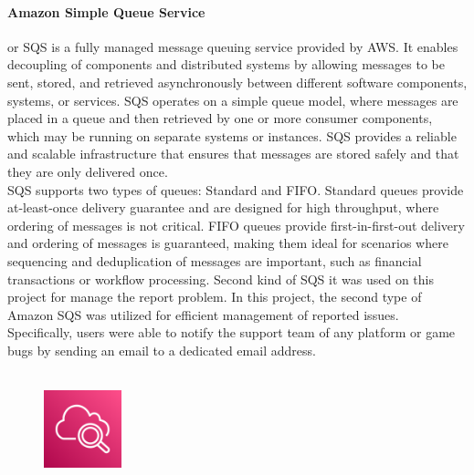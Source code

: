 \documentclass[a4paper,12pt]{report}
\begin{document}
\paragraph{Amazon Simple Queue Service} or SQS is a fully managed message queuing service provided by AWS. It enables decoupling of components and distributed systems by allowing messages to be sent, stored, and retrieved asynchronously between different software components, systems, or services.
SQS operates on a simple queue model, where messages are placed in a queue and then retrieved by one or more consumer components, which may be running on separate systems or instances. SQS provides a reliable and scalable infrastructure that ensures that messages are stored safely and that they are only delivered once.\\
SQS supports two types of queues: Standard and FIFO. Standard queues provide at-least-once delivery guarantee and are designed for high throughput, where ordering of messages is not critical. FIFO queues provide first-in-first-out delivery and ordering of messages is guaranteed, making them ideal for scenarios where sequencing and deduplication of messages are important, such as financial transactions or workflow processing. Second kind of SQS it was used on this project for manage the report problem. In this project, the second type of Amazon SQS was utilized for efficient management of reported issues. Specifically, users were able to notify the support team of any platform or game bugs by sending an email to a dedicated email address.\\\\

%
%
%
\begin{figure}
  \centering
  \includegraphics[width=0.2\textwidth]{img/services/CloudWatch}
\end{figure}
%
\end{document}
